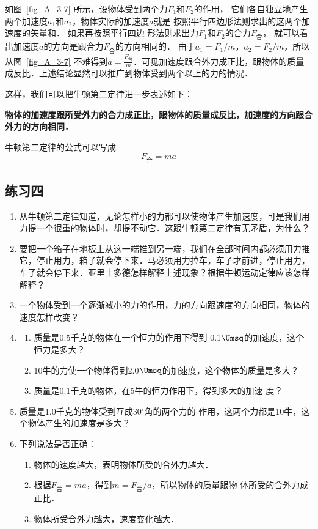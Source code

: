 如图~\ref{fig_A_3-7} 所示，设物体受到两个力$F_1$和$F_2$的作用，
它们各自独立地产生两个加速度$a_1$和$a_2$，物体实际的加速度$a$就是
按照平行四边形法则求出的这两个加速度的矢量和．
如果再按照平行四边
形法则求出力$F_1$和$F_2$的合力$F_{\text{合}}$，
就可以看出加速度$a$的方向是跟合力$F_{\text{合}}$的方向相同的．
由于$a_1=F_1/m$，$a_2=F_2/m$，所以从图~\ref{fig_A_3-7} 不难得到$a=\frac{F_{\text{合}}}{m}$．可见加速度跟合外力成正比，跟物体的质量成反比．上述结论显然可以推广到物体受到两个以上的力的情况．

这样，我们可以把牛顿第二定律进一步表述如下：

\textbf{物体的加速度跟所受外力的合力成正比，跟物体的质量成反比，加速度的方向跟合外力的方向相同．}

牛顿第二定律的公式可以写成
\[F_{\text{合}}=ma\]


\subsection*{练习四}
\begin{enumerate}
	\item 从牛顿第二定律知道，无论怎样小的力都可以使物体产生加速度，可是我们用力提一个很重的物体时，却提不动它．这跟牛顿第二定律有无矛盾，为什么？
\item 要把一个箱子在地板上从这一端推到另一端，我们在全部时间内都必须用力推它，停止用力，箱子就会停下来．马必须用力拉车，车子才前进，停止用力，车子就会停下来．亚里士多德怎样解释上述现象？根据牛顿运动定律应该怎样解释？
\item 一个物体受到一个逐渐减小的力的作用，力的方向跟速度的方向相同，物体的速度怎样改变？
\item \begin{enumerate}
\item  质量是0.5千克的物体在一个恒力的作用下得到
0.1$\Umsq$的加速度，这个恒力是多大？
\item 10牛的力使一个物体得到2.0$\Umsq$的加速度，这个物体的质量是多大？
\item 质量是0.1千克的物体，在5牛的恒力作用下，得到多大的加速
度？
\end{enumerate}
 \item 质量是1.0千克的物体受到互成30$^\circ$角的两个力的
作用，这两个力都是10牛，这个物体产生的加速度是多大？
\item 下列说法是否正确：
\begin{enumerate}
\item 物体的速度越大，表明物体所受的合外力越大．
\item 根据$F_{\text{合}}=ma$，得到$m=F_{\text{合}}/a$，所以物体的质量跟物
体所受的合外力成正比．
\item 物体所受合外力越大，速度变化越大．
\end{enumerate}


\end{enumerate}

